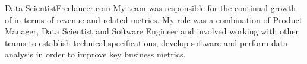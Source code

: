 \begin{professionalExperience}
{Data Scientist}{Freelancer.com}
{
  My team was responsible for the continual growth of 
  in terms of revenue and related metrics. My role was a combination of Product
  Manager, Data Scientist and Software Engineer and involved working with other
  teams to establish technical specifications, develop software and perform data
  analysis in order to improve key business metrics.
}

\end{professionalExperience}
